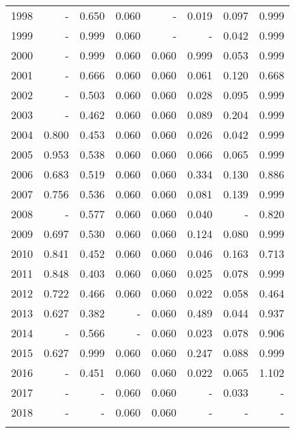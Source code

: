 \begin{longtable}{lrrrrrrr}
  1998 & - & 0.650 & 0.060 & - & 0.019 & 0.097 & 0.999 \\ 
  1999 & - & 0.999 & 0.060 & - & - & 0.042 & 0.999 \\ 
  2000 & - & 0.999 & 0.060 & 0.060 & 0.999 & 0.053 & 0.999 \\ 
  2001 & - & 0.666 & 0.060 & 0.060 & 0.061 & 0.120 & 0.668 \\ 
  2002 & - & 0.503 & 0.060 & 0.060 & 0.028 & 0.095 & 0.999 \\ 
  2003 & - & 0.462 & 0.060 & 0.060 & 0.089 & 0.204 & 0.999 \\ 
  2004 & 0.800 & 0.453 & 0.060 & 0.060 & 0.026 & 0.042 & 0.999 \\ 
  2005 & 0.953 & 0.538 & 0.060 & 0.060 & 0.066 & 0.065 & 0.999 \\ 
  2006 & 0.683 & 0.519 & 0.060 & 0.060 & 0.334 & 0.130 & 0.886 \\ 
  2007 & 0.756 & 0.536 & 0.060 & 0.060 & 0.081 & 0.139 & 0.999 \\ 
  2008 & - & 0.577 & 0.060 & 0.060 & 0.040 & - & 0.820 \\ 
  2009 & 0.697 & 0.530 & 0.060 & 0.060 & 0.124 & 0.080 & 0.999 \\ 
  2010 & 0.841 & 0.452 & 0.060 & 0.060 & 0.046 & 0.163 & 0.713 \\ 
  2011 & 0.848 & 0.403 & 0.060 & 0.060 & 0.025 & 0.078 & 0.999 \\ 
  2012 & 0.722 & 0.466 & 0.060 & 0.060 & 0.022 & 0.058 & 0.464 \\ 
  2013 & 0.627 & 0.382 & - & 0.060 & 0.489 & 0.044 & 0.937 \\ 
  2014 & - & 0.566 & - & 0.060 & 0.023 & 0.078 & 0.906 \\ 
  2015 & 0.627 & 0.999 & 0.060 & 0.060 & 0.247 & 0.088 & 0.999 \\ 
  2016 & - & 0.451 & 0.060 & 0.060 & 0.022 & 0.065 & 1.102 \\ 
  2017 & - & - & 0.060 & 0.060 & - & 0.033 & - \\ 
  2018 & - & - & 0.060 & 0.060 & - & - & - \\ 
   \hline
\hline
\label{tab:epsilon2}
\end{longtable}
\endgroup

